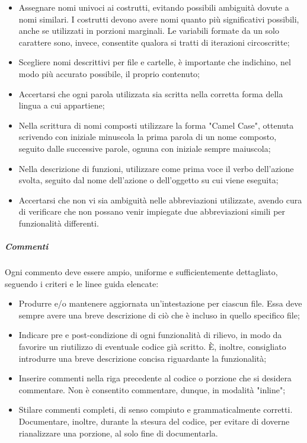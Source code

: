 \begin{itemize}
\item
Assegnare nomi univoci ai costrutti, evitando possibili ambiguità dovute a nomi similari. I costrutti devono avere nomi quanto più significativi possibili, anche se utilizzati in porzioni marginali. Le variabili formate da un solo carattere sono, invece, consentite qualora si tratti di iterazioni circoscritte;
\item
Scegliere nomi descrittivi per file e cartelle, è importante che indichino, nel modo più accurato possibile, il proprio contenuto;
\item
Accertarsi che ogni parola utilizzata sia scritta nella corretta forma della lingua a cui appartiene;
\item
Nella scrittura di nomi composti utilizzare la forma "Camel Case", ottenuta scrivendo con iniziale minuscola la prima parola di un nome composto, seguito dalle successive parole, ognuna con iniziale sempre maiuscola;
\item
Nella descrizione di funzioni, utilizzare come prima voce il verbo dell'azione svolta, seguito dal nome dell'azione o dell'oggetto su cui viene eseguita;
\item
Accertarsi che non vi sia ambiguità nelle abbreviazioni utilizzate, avendo cura di verificare che non possano venir impiegate due abbreviazioni simili per funzionalità differenti.
\end{itemize}

\subparagraph{Commenti}
Ogni commento deve essere ampio, uniforme e sufficientemente dettagliato, seguendo i criteri e le linee guida elencate:

\begin{itemize}
\item
Produrre e/o mantenere aggiornata un'intestazione per ciascun file. Essa deve sempre avere una breve descrizione di ciò che è incluso in quello specifico file;
\item
Indicare pre e post-condizione di ogni funzionalità di rilievo, in modo da favorire un riutilizzo di eventuale codice già scritto. \MakeUppercase{è}, inoltre, consigliato introdurre una breve descrizione concisa riguardante la funzionalità;
\item
Inserire commenti nella riga precedente al codice o porzione che si desidera commentare. Non è consentito commentare, dunque, in modalità "inline";
\item
Stilare commenti completi, di senso compiuto e grammaticalmente corretti. Documentare, inoltre, durante la stesura del codice, per evitare di doverne rianalizzare una porzione, al solo fine di documentarla.
\end{itemize}

